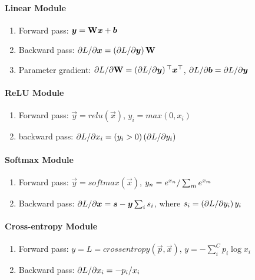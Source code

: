 \paragraph{Linear Module}

\begin{enumerate}
	\item Forward pass: $\boldsymbol{y}=\mathbf{W}\boldsymbol{x}+\boldsymbol{b}$
	\item Backward pass: $\partial L/\partial\boldsymbol{x}=\left(\partial L/\partial\boldsymbol{y}\right)\mathbf{W}$
	\item Parameter gradient: $\partial L/\partial\mathbf{W}=\left(\partial L/\partial\boldsymbol{y}\right){}^\top\boldsymbol{x}{}^\top$, $\partial L/\partial\boldsymbol{b}=\partial L/\partial\boldsymbol{y}$
\end{enumerate}

\paragraph{ReLU Module}

\begin{enumerate}
	\item Forward pass: $\vec{y}=relu(\vec{x})$, $y_i=max(0,x_i)$
	\item backward pass: $\partial L/\partial x_i=(y_i>0)\left(\partial L/\partial y_i\right)$
\end{enumerate}

\paragraph{Softmax Module}

\begin{enumerate}
	\item Forward pass: $\vec{y}=softmax(\vec{x})$, $y_n=e^{x_n}/\sum_m e^{x_m}$
	\item Backward pass: $\partial L/\partial\boldsymbol{x}=\boldsymbol{s}-\boldsymbol{y}\sum_i s_i$, where $s_i=\left(\partial L/\partial y_i\right)y_i$
\end{enumerate}

\paragraph{Cross-entropy Module}

\begin{enumerate}
	\item Forward pass: $y=L=crossentropy(\vec{p},\vec{x})$, $y=-\sum_i^C p_i\log x_i$
	\item Backward pass: $\partial L/\partial x_i=-p_i/x_i$
\end{enumerate}

